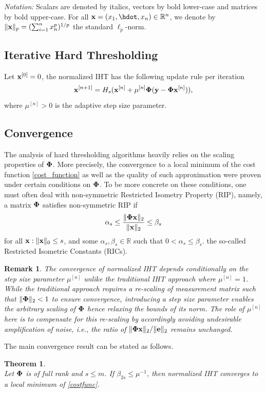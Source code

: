 \documentclass{article}
\newtheorem{theorem}{Theorem}
\newtheorem{remark}{Remark}
\begin{document}
{\it Notation:} Scalars are denoted by italics, vectors by bold lower-case and matrices by bold upper-case. For all ${\bf x}= (x_1, \hdot, x_n) \in \mathbb{R}^n$, we denote by $\|{\bf x}\|_p = (\sum_{i=1}^n x_n^p)^{1/p}$ the standard ${\ell}_p$-norm.
\subsection{Iterative Hard Thresholding} 
Let ${\bf x}^{[0]} = 0$, the normalized IHT has the following update rule per iteration
\begin{equation}\label{iht_update_rule}
{\bf x}^{[n+1]} = H_s({\bf x}^{[n]} + \mu^{[n]}{\bf \Phi}({\bf y}-{\bf \Phi}{\bf x}^{[n]})),
\end{equation}
where $\mu^{[n]}>0$ is the adaptive step size parameter. %

\subsection{Convergence} 
The analysis of hard thresholding algorithms heavily relies on the scaling properties of ${\bf \Phi}$. More precisely, the convergence to a local minimum of the cost function \ref{cost_function} as well as the quality of such approximation were proven under certain conditions on ${\bf \Phi}$. To be more concrete on these conditions, one must often deal with non-symmetric Restricted Isometry Property (RIP), namely, a matrix ${\bf \Phi}$ satisfies non-symmetric RIP if
\begin{equation}\label{rip}
\alpha_{s} \leq \frac{\|{\bf \Phi} {\bf x}\|_2}{\|{\bf x}\|_2} \leq \beta_{s}
\end{equation}
for all ${\bf x}: \|{\bf x}\|_0 \leq s$, and some $\alpha_s, \beta_s \in \mathbb{R}$ such that $0<\alpha_s\leq \beta_s$. the so-called Restricted Isometric Constants (RICs).
\begin{remark}\label{remark_noise_amp}
The convergence of normalized IHT depends conditionally on the step size parameter $\mu^{[n]}$ unlike the traditional IHT approach where $\mu^{[n]}=1$.
While the traditional approach requires a re-scaling of measurement matrix such that $\|{\bf \Phi}\|_2 <1$ to ensure convergence, introducing a step size parameter enables the arbitrary scaling of ${\bf \Phi}$ hence relaxing the bounds of its norm. The role of $\mu^{[n]}$ here is to compensate for this re-scaling by accordingly avoiding undesirable amplification of noise, i.e., the ratio of $\|{\bf \Phi x}\|_2/\|{\bf e}\|_2$ remains unchanged. 
\end{remark}
The main convergence result can be stated as follows.
\begin{theorem}
{\rm{\cite{blumensath2012greedy}}}\\ 
Let ${\bf \Phi}$ is of full rank and $s\leq m$. If $\beta_{2s}\leq\mu^{-1}$, then normalized IHT converges to a local minimum of \ref{costfunc}.
\end{theorem}
\end{document}
